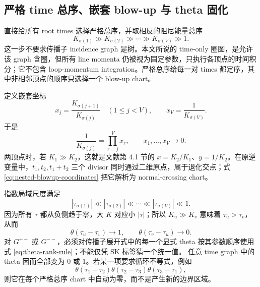 \documentclass[11pt,a4paper]{ctexart}
\begin{document}
\subsection{严格 time 总序、嵌套 blow-up 与 theta 固化}

直接给所有 root times 选择严格总序，并取相反的阻尼能量总序
\begin{equation}
 K_{\sigma(1)}\gg K_{\sigma(2)}\gg\cdots
 \gg K_{\sigma(V)}\gg1.
 \label{eq:strict-energy-rank}
\end{equation}
这一步不要求传播子 incidence graph 是树。本文所说的 time-only 圈图，是允许该 graph 含圈，但所有 line momenta 仍被视为固定参数，只执行各顶点的时间积分；它不包含 loop-momentum integration。严格总序给每一对 times 都定序，其中非相邻顶点的顺序只选择一个 blow-up chart。

定义嵌套坐标
\begin{equation}
 x_j=\frac{K_{\sigma(j+1)}}{K_{\sigma(j)}}
 \quad(1\leq j<V),
 \qquad
 x_V=\frac{1}{K_{\sigma(V)}}.
 \label{eq:nested-blowup-coordinates}
\end{equation}
于是
\begin{equation}
 \frac{1}{K_{\sigma(j)}}=\prod_{r=j}^{V}x_r,
 \qquad x_1,\ldots,x_V\longrightarrow0.
 \label{eq:nested-energy-inverse}
\end{equation}
两顶点时，若 $K_1\gg K_2$，这就是文献第 4.1 节的 $x=K_2/K_1$、$y=1/K_2$。在原逆变量中，$t_1,t_2,t_1+t_2$ 三个 divisor 同时通过二维原点，属于退化交点；式 \eqref{eq:nested-blowup-coordinates} 把它解析为 normal-crossing chart。

指数局域尺度满足
\begin{equation}
 |\tau_{\sigma(1)}|\ll|\tau_{\sigma(2)}|\ll\cdots
 \ll|\tau_{\sigma(V)}|\ll1.
 \label{eq:tau-rank}
\end{equation}
因为所有 $\tau$ 都从负侧趋于零，大 $K$ 对应小 $|\tau|$；所以 $K_u\gg K_v$ 意味着 $\tau_u>\tau_v$，从而
\begin{equation}
 \theta(\tau_u-\tau_v)\longrightarrow1,
 \qquad
 \theta(\tau_v-\tau_u)\longrightarrow0.
 \label{eq:theta-rank-rule}
\end{equation}
对 $G^{++}$ 或 $G^{--}$，必须对传播子展开式中的每一个显式 theta 按其参数顺序使用式 \eqref{eq:theta-rank-rule}；不能仅凭 SK 标签猜一个统一值。
任意 time graph 中的 theta 因而全部变为 $0$ 或 $1$。若某一项要求循环不等式，例如
\begin{equation}
 \theta(\tau_1-\tau_2)\theta(\tau_2-\tau_3)
 \theta(\tau_3-\tau_1),
\end{equation}
则它在每个严格总序 chart 中自动为零，而不是产生新的边界区域。
\end{document}
